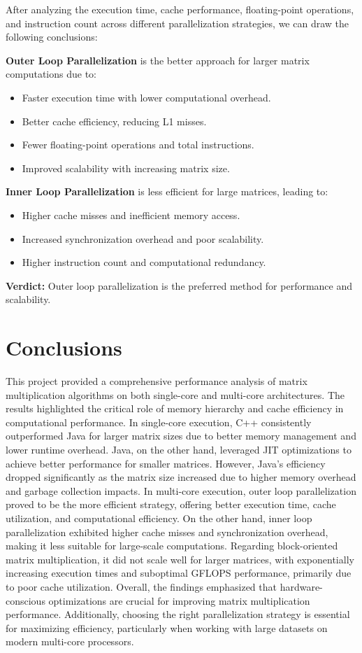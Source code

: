 \documentclass{article}
\begin{document}
After analyzing the execution time, cache performance, floating-point operations, and instruction count across different parallelization strategies, we can draw the following conclusions:


\textbf{Outer Loop Parallelization} is the better approach for larger matrix computations due to:

\begin{itemize}
    \item Faster execution time with lower computational overhead.
    \item Better cache efficiency, reducing L1 misses.
    \item Fewer floating-point operations and total instructions.
    \item Improved scalability with increasing matrix size.
\end{itemize}

\textbf{Inner Loop Parallelization} is less efficient for large matrices, leading to:

\begin{itemize}
    \item Higher cache misses and inefficient memory access.
    \item Increased synchronization overhead and poor scalability.
    \item Higher instruction count and computational redundancy.
\end{itemize}

\textbf{Verdict:} Outer loop parallelization is the preferred method for performance and scalability.

\section{Conclusions}

This project provided a comprehensive performance analysis of matrix multiplication algorithms on both single-core and multi-core architectures. The results highlighted the critical role of memory hierarchy and cache efficiency in computational performance. In single-core execution, C++ consistently outperformed Java for larger matrix sizes due to better memory management and lower runtime overhead. Java, on the other hand, leveraged JIT optimizations to achieve better performance for smaller matrices. However, Java's efficiency dropped significantly as the matrix size increased due to higher memory overhead and garbage collection impacts. In multi-core execution, outer loop parallelization proved to be the more efficient strategy, offering better execution time, cache utilization, and computational efficiency. On the other hand, inner loop parallelization exhibited higher cache misses and synchronization overhead, making it less suitable for large-scale computations. Regarding block-oriented matrix multiplication, it did not scale well for larger matrices, with exponentially increasing execution times and suboptimal GFLOPS performance, primarily due to poor cache utilization. Overall, the findings emphasized that hardware-conscious optimizations are crucial for improving matrix multiplication performance. Additionally, choosing the right parallelization strategy is essential for maximizing efficiency, particularly when working with large datasets on modern multi-core processors.
\end{document}

